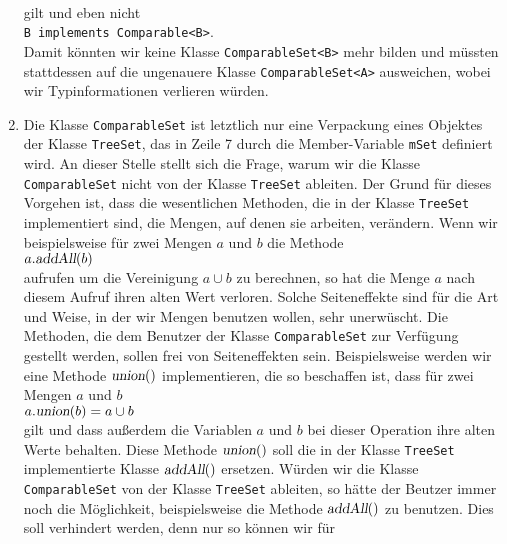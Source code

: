 \begin{enumerate}
      \\[0.2cm]
      gilt und eben nicht
      \\[0.2cm]
      \hspace*{1.3cm}
      \texttt{B implements Comparable<B>}.
      \\[0.2cm]
      Damit k\"onnten wir keine Klasse \texttt{ComparableSet<B>} mehr bilden und
      m\"ussten stattdessen auf die ungenauere Klasse \texttt{ComparableSet<A>} ausweichen,
      wobei  wir Typinformationen verlieren w\"urden.
\item Die Klasse \texttt{ComparableSet} ist letztlich nur eine Verpackung eines 
      Objektes der Klasse \texttt{TreeSet}, das in Zeile 7 durch die Member-Variable
      \texttt{mSet}  definiert wird.  An dieser Stelle stellt sich die Frage,
      warum wir die Klasse \texttt{ComparableSet} nicht von der Klasse \texttt{TreeSet}
      ableiten.  Der Grund f\"ur dieses Vorgehen ist, dass die wesentlichen Methoden, die in der
      Klasse \texttt{TreeSet} implementiert sind, die Mengen, auf denen sie arbeiten,
      ver\"andern.  Wenn wir beispielsweise f\"ur zwei Mengen $a$ und $b$ die Methode
      \\[0.2cm]
      \hspace*{1.3cm}
      $a.\textsl{addAll}(b)$
      \\[0.2cm]
      aufrufen um die Vereinigung $a \cup b$ zu berechnen, so hat die Menge $a$ nach
      diesem Aufruf ihren alten Wert verloren.  Solche Seiteneffekte sind f\"ur die Art und
      Weise, in der wir Mengen benutzen wollen, sehr unerw\"uscht.  Die Methoden, die dem
      Benutzer der Klasse \texttt{ComparableSet} zur Verf\"ugung gestellt werden, sollen
      frei von Seiteneffekten sein.  Beispielsweise werden wir eine Methode $\textsl{union}()$
      implementieren, die so beschaffen ist, dass f\"ur zwei Mengen $a$ und $b$
      \\[0.2cm]
      \hspace*{1.3cm}
      $a.\textsl{union}(b) = a \cup b$
      \\[0.2cm]
      gilt und dass au{\ss}erdem die Variablen $a$ und $b$ bei dieser Operation ihre alten Werte behalten.
      Diese Methode $\textsl{union}()$ soll die in der Klasse \texttt{TreeSet} implementierte Klasse
      $\textsl{addAll}()$ ersetzen.  W\"urden wir die Klasse \texttt{ComparableSet} von der Klasse
      \texttt{TreeSet} ableiten, so h\"atte der Beutzer immer noch die M\"oglichkeit, beispielsweise die
      Methode $\textsl{addAll}()$ zu benutzen.  Dies soll verhindert werden, denn nur so k\"onnen wir f\"ur

\end{enumerate}
